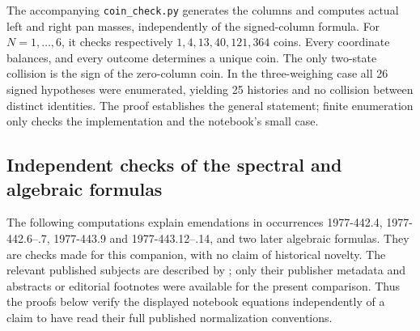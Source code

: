 \begin{example}\oursComputed{}
The accompanying \texttt{coin\_check.py} generates the columns and computes
actual left and right pan masses, independently of the signed-column
formula.  For \(N=1,\ldots,6\), it checks respectively
\(1,4,13,40,121,364\) coins.  Every coordinate balances, and every outcome
determines a unique coin.  The only two-state collision is the sign of the
zero-column coin.  In the three-weighing case all 26 signed hypotheses were
enumerated, yielding 25 histories and no collision between distinct
identities.  The proof establishes the general statement; finite enumeration
only checks the implementation and the notebook's small case.
\end{example}




\subsection{Independent checks of the spectral and algebraic formulas}

The following computations explain emendations in occurrences
1977-442.4, 1977-442.6--.7, 1977-443.9 and 1977-443.12--.14, and two later
algebraic formulas. They are checks made for this companion, with no claim
of historical novelty. The relevant published subjects are described by
\citet{calogerodegasperis1976inverse,calogerodegasperis1978extension,calogero1978motion}; only their publisher metadata and abstracts or
editorial footnotes were available for the present comparison. Thus the
proofs below verify the displayed notebook equations independently of a
claim to have read their full published normalization conventions.

